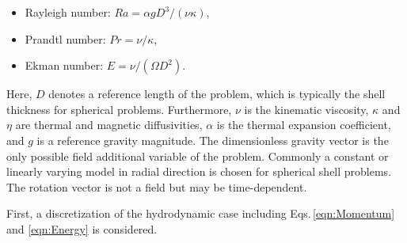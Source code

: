 \documentclass[review]{revtex4-1}
\newcommand{\gmu}{\textrm{\greektext m}}
\newcommand{\gLambda}{\textit{\greektext L}}
\newcommand{\Reynolds}{\mathit{Re}}
\newcommand{\magReynolds}{\mathit{Rm}}
\newcommand{\Prandtl}{\mathit{Pr}}
\newcommand{\magPrandtl}{\mathit{Pm}}
\newcommand{\Rayleigh}{\mathit{Ra}}
\newcommand{\modRayleigh}{\mathit{Ra}^*}
\newcommand{\Elsasser}{\mathit{\gLambda}}
\newcommand{\Ekman}{\mathit{E}}
\begin{document}
\begin{itemize}
	\item Rayleigh number: $\Rayleigh=\alpha g D^3/(\nu\kappa)$,
	\item Prandtl number: $\Prandtl=\nu/\kappa$,
	\item Ekman number:	$\Ekman=\nu/(\Omega D^2)$.
\end{itemize}
Here, $D$ denotes a reference length of the problem, which is typically the shell thickness for spherical problems. Furthermore, $\nu$ is the kinematic viscosity, $\kappa$ and $\eta$ are thermal and magnetic diffusivities, $\alpha$ is the thermal expansion coefficient, and $g$ is a reference gravity magnitude. The dimensionless gravity vector is the only possible field additional variable of the problem. Commonly a constant or linearly varying model in radial direction is chosen for spherical shell problems. The rotation vector is not a field but may be time-dependent. 

First, a discretization of the hydrodynamic case including Eqs.\,\eqref{eqn:Momentum} and \eqref{eqn:Energy} is considered. 
\end{document}

